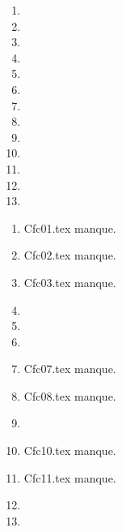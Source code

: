  
 
\begin{enumerate}
  \item  
  \item  
  \item  
  \item  
  \item  
  \item  
  \item  
  \item  
  \item  
  \item  
  \item  
  \item  
  \item  
\end{enumerate} 
\clearpage 
{}
\begin{enumerate}
  \item Cfc01.tex manque. 
  \item Cfc02.tex manque. 
  \item Cfc03.tex manque. 
  \item  
  \item  
  \item  
  \item Cfc07.tex manque. 
  \item Cfc08.tex manque. 
  \item  
  \item Cfc10.tex manque. 
  \item Cfc11.tex manque. 
  \item  
  \item  
\end{enumerate} 
